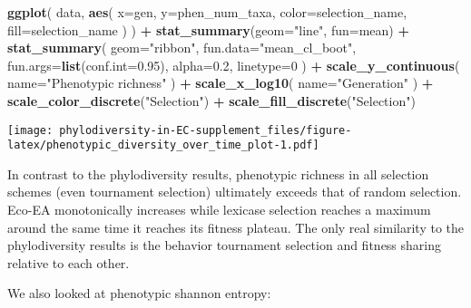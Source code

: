 \documentclass[]{book}
\newenvironment{Shaded}{\begin{snugshade}}{\end{snugshade}}
\newcommand{\DataTypeTok}[1]{\textcolor[rgb]{0.13,0.29,0.53}{#1}}
\newcommand{\DecValTok}[1]{\textcolor[rgb]{0.00,0.00,0.81}{#1}}
\newcommand{\FloatTok}[1]{\textcolor[rgb]{0.00,0.00,0.81}{#1}}
\newcommand{\KeywordTok}[1]{\textcolor[rgb]{0.13,0.29,0.53}{\textbf{#1}}}
\newcommand{\NormalTok}[1]{#1}
\newcommand{\OperatorTok}[1]{\textcolor[rgb]{0.81,0.36,0.00}{\textbf{#1}}}
\newcommand{\StringTok}[1]{\textcolor[rgb]{0.31,0.60,0.02}{#1}}
\begin{document}
\begin{Shaded}
\begin{Highlighting}[]
\KeywordTok{ggplot}\NormalTok{(}
\NormalTok{    data,}
    \KeywordTok{aes}\NormalTok{(}
      \DataTypeTok{x=}\NormalTok{gen,}
      \DataTypeTok{y=}\NormalTok{phen_num_taxa,}
      \DataTypeTok{color=}\NormalTok{selection_name,}
      \DataTypeTok{fill=}\NormalTok{selection_name}
\NormalTok{    )}
\NormalTok{  ) }\OperatorTok{+}
\StringTok{  }\KeywordTok{stat_summary}\NormalTok{(}\DataTypeTok{geom=}\StringTok{"line"}\NormalTok{, }\DataTypeTok{fun=}\NormalTok{mean) }\OperatorTok{+}
\StringTok{  }\KeywordTok{stat_summary}\NormalTok{(}
    \DataTypeTok{geom=}\StringTok{"ribbon"}\NormalTok{,}
    \DataTypeTok{fun.data=}\StringTok{"mean_cl_boot"}\NormalTok{,}
    \DataTypeTok{fun.args=}\KeywordTok{list}\NormalTok{(}\DataTypeTok{conf.int=}\FloatTok{0.95}\NormalTok{),}
    \DataTypeTok{alpha=}\FloatTok{0.2}\NormalTok{,}
    \DataTypeTok{linetype=}\DecValTok{0}
\NormalTok{  ) }\OperatorTok{+}
\StringTok{  }\KeywordTok{scale_y_continuous}\NormalTok{(}
    \DataTypeTok{name=}\StringTok{"Phenotypic richness"}
\NormalTok{  ) }\OperatorTok{+}
\StringTok{  }\KeywordTok{scale_x_log10}\NormalTok{(}
    \DataTypeTok{name=}\StringTok{"Generation"}
\NormalTok{  ) }\OperatorTok{+}
\StringTok{  }\KeywordTok{scale_color_discrete}\NormalTok{(}\StringTok{"Selection"}\NormalTok{) }\OperatorTok{+}\StringTok{ }
\StringTok{  }\KeywordTok{scale_fill_discrete}\NormalTok{(}\StringTok{"Selection"}\NormalTok{)}
\end{Highlighting}
\end{Shaded}

\texttt{[image: phylodiversity-in-EC-supplement\_files/figure-latex/phenotypic\_diversity\_over\_time\_plot-1.pdf]}

In contrast to the phylodiversity results, phenotypic richness in all selection schemes (even tournament selection) ultimately exceeds that of random selection. Eco-EA monotonically increases while lexicase selection reaches a maximum around the same time it reaches its fitness plateau. The only real similarity to the phylodiversity results is the behavior tournament selection and fitness sharing relative to each other.

We also looked at phenotypic shannon entropy:
\end{document}
